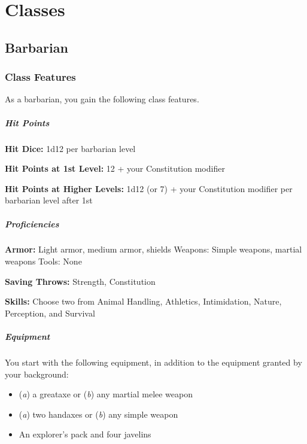 \chapter{Classes}
\hypertarget{barbarian}{%
\section{Barbarian}\label{barbarian}}

\hypertarget{class-features}{%
\subsection{Class Features}\label{class-features}}

As a barbarian, you gain the following class features.

\hypertarget{hit-points}{%
\paragraph{Hit Points}\label{hit-points}}

\textbf{Hit Dice:} 1d12 per barbarian level

\textbf{Hit Points at 1st Level:} 12 + your Constitution modifier

\textbf{Hit Points at Higher Levels:} 1d12 (or 7) + your Constitution
modifier per barbarian level after 1st

\hypertarget{proficiencies}{%
\paragraph{Proficiencies}\label{proficiencies}}

\textbf{Armor:} Light armor, medium armor, shields Weapons: Simple
weapons, martial weapons Tools: None

\textbf{Saving Throws:} Strength, Constitution

\textbf{Skills:} Choose two from Animal Handling, Athletics,
Intimidation, Nature, Perception, and Survival

\hypertarget{equipment}{%
\paragraph{Equipment}\label{equipment}}

You start with the following equipment, in addition to the equipment
granted by your background:

\begin{itemize}
\item
  (\emph{a}) a greataxe or (\emph{b}) any martial melee weapon
\item
  (\emph{a}) two handaxes or (\emph{b}) any simple weapon
\item
  An explorer's pack and four javelins
\end{itemize}

